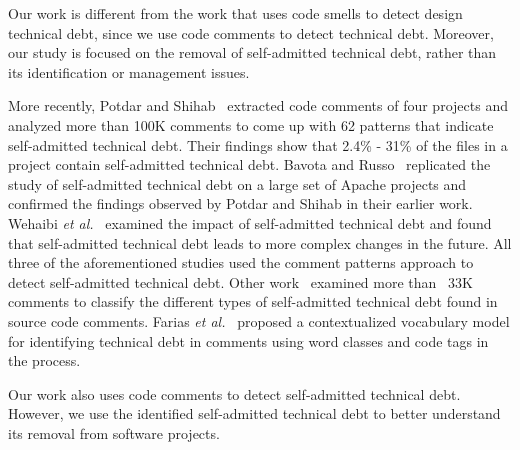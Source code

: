 Our work is different from the work that uses code smells to detect design technical debt, since we use code comments to detect technical debt. Moreover, our study is focused on the removal of self-admitted technical debt, rather than its identification or management issues.

More recently, Potdar and Shihab~\cite{Potdar2014ICSME} extracted code comments of four projects and analyzed more than 100K comments to come up with 62  patterns that indicate self-admitted technical debt. Their findings show that 2.4\% - 31\% of the files in a project contain self-admitted technical debt. Bavota and Russo~\cite{Bavota2016MSR} replicated the study of self-admitted technical debt on a large set of Apache projects and confirmed the findings observed by Potdar and Shihab in their earlier work. Wehaibi \textit{et al.}~\cite{Wehaibi2016SANER} examined the impact of self-admitted technical debt and found that self-admitted technical debt leads to more complex changes in the future. All three of the aforementioned studies used the comment patterns approach to detect self-admitted technical debt. Other work~\cite{Maldonado2015MTD} examined more than ~33K comments to classify the different types of self-admitted technical debt found in source code comments. Farias \textit{et al.}~\cite{Farias2015MTD} proposed a contextualized vocabulary model for identifying technical debt in comments using word classes and code tags in the process. 

Our work also uses code comments to detect self-admitted technical debt. However, we use the identified self-admitted technical debt to better understand its removal from software projects.




